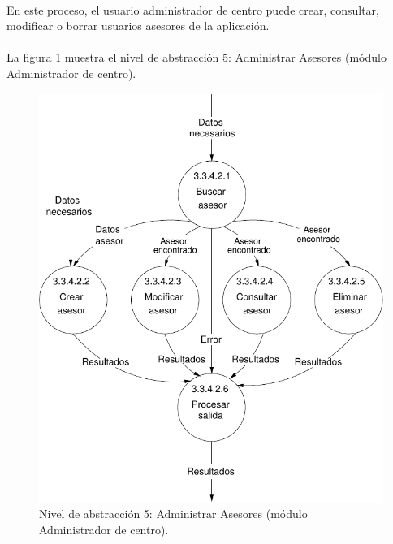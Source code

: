 \paragraph{}En este proceso, el usuario administrador de centro puede crear,
consultar, modificar o borrar usuarios asesores de la aplicación.

\paragraph{}La figura \ref{diagramaNivel5-AdministrarAsesores-admCentro}
muestra el nivel de abstracción 5: Administrar Asesores (módulo Administrador
de centro).

  \begin{figure}[!ht]
    \begin{center}
      \includegraphics[]{08.Analisis_Funcional/8.2.DFDs/Niveles/Nivel5/AdministradorCentro/AdministrarUsuarios/AdministrarAsesores/Diagramas/nivel5-AdministrarAsesores.pdf}
      \caption{Nivel de abstracción 5: Administrar Asesores (módulo
      Administrador de centro).}
      \label{diagramaNivel5-AdministrarAsesores-admCentro}
    \end{center}
  \end{figure}
